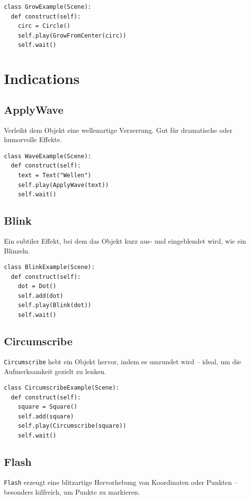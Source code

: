 \documentclass[12pt]{article}
\begin{document}
\begin{verbatim}
class GrowExample(Scene):
  def construct(self):
    circ = Circle()
    self.play(GrowFromCenter(circ))
    self.wait()
\end{verbatim}

\section{Indications}
\subsection{ApplyWave}
Verleiht dem Objekt eine wellenartige Verzerrung. Gut für dramatische oder humorvolle Effekte.

\begin{verbatim}
class WaveExample(Scene):
  def construct(self):
    text = Text("Wellen")
    self.play(ApplyWave(text))
    self.wait()
\end{verbatim}

\subsection{Blink}
Ein subtiler Effekt, bei dem das Objekt kurz aus- und eingeblendet wird, wie ein Blinzeln.

\begin{verbatim}
class BlinkExample(Scene):
  def construct(self):
    dot = Dot()
    self.add(dot)
    self.play(Blink(dot))
    self.wait()
\end{verbatim}

\subsection{Circumscribe}
\texttt{Circumscribe} hebt ein Objekt hervor, indem es umrundet wird – ideal, um die Aufmerksamkeit gezielt zu lenken.

\begin{verbatim}
class CircumscribeExample(Scene):
  def construct(self):
    square = Square()
    self.add(square)
    self.play(Circumscribe(square))
    self.wait()
\end{verbatim}

\subsection{Flash}
\texttt{Flash} erzeugt eine blitzartige Hervorhebung von Koordinaten oder Punkten – besonders hilfreich, um Punkte zu markieren.
\end{document}
